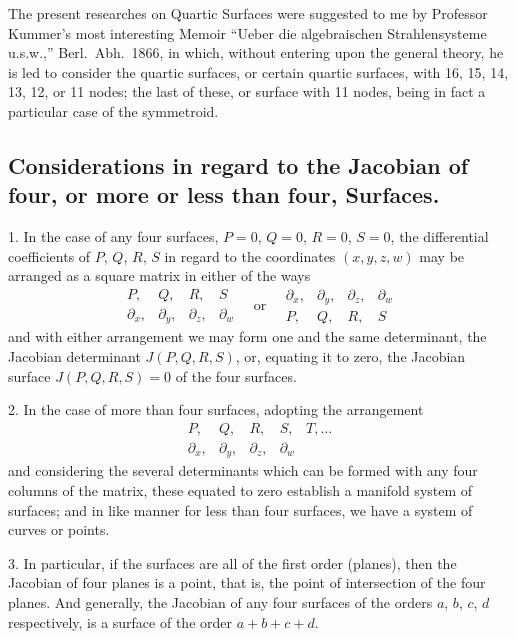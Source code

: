 \documentclass[11pt,a4paper]{article}
\begin{document}
The present researches on Quartic Surfaces were suggested to me by Professor Kummer's most interesting Memoir ``Ueber die algebraischen Strahlensysteme u.s.w.,'' Berl.\ Abh.\ 1866, in which, without entering upon the general theory, he is led to consider the quartic surfaces, or certain quartic surfaces, with 16, 15, 14, 13, 12, or 11 nodes; the last of these, or surface with 11 nodes, being in fact a particular case of the symmetroid.

\subsection*{Considerations in regard to the Jacobian of four, or more or less than four, Surfaces.}

1. In the case of any four surfaces, $P = 0$, $Q = 0$, $R = 0$, $S = 0$, the differential coefficients of $P$, $Q$, $R$, $S$ in regard to the coordinates $(x, y, z, w)$ may be arranged as a square matrix in either of the ways
\[
\begin{array}{cccc}
P, & Q, & R, & S \\
\partial_x, & \partial_y, & \partial_z, & \partial_w
\end{array}
\quad\text{or}\quad
\begin{array}{cccc}
\partial_x, & \partial_y, & \partial_z, & \partial_w \\
P, & Q, & R, & S
\end{array}
\]
and with either arrangement we may form one and the same determinant, the Jacobian determinant $J(P, Q, R, S)$, or, equating it to zero, the Jacobian surface $J(P, Q, R, S) = 0$ of the four surfaces.

2. In the case of more than four surfaces, adopting the arrangement
\[
\begin{array}{ccccc}
P, & Q, & R, & S, & T, \ldots \\
\partial_x, & \partial_y, & \partial_z, & \partial_w
\end{array}
\]
and considering the several determinants which can be formed with any four columns of the matrix, these equated to zero establish a manifold system of surfaces; and in like manner for less than four surfaces, we have a system of curves or points.

3. In particular, if the surfaces are all of the first order (planes), then the Jacobian of four planes is a point, that is, the point of intersection of the four planes. And generally, the Jacobian of any four surfaces of the orders $a$, $b$, $c$, $d$ respectively, is a surface of the order $a + b + c + d$.
\end{document}
